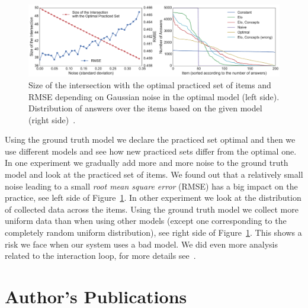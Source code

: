 \documentclass[table,color,cover,twoside,nolot,nolof]{fithesis3/fithesis3}
\begin{document}
\begin{figure}[h]
	\begin{center}
		\includegraphics[width=\textwidth]{figure/noise_vs_intersection_number_of_answers}
		\caption{Size of the intersection with the optimal practiced set of items and RMSE
			depending on Gaussian noise in the optimal model (left side). Distribution of answers over
			the items based on the given model (right side)~\cite{niznan2015exploring}.}
		\label{figure:feedback_by_success}
	\end{center}
\end{figure}

Using the ground truth model we declare the practiced set
optimal and then we use different models and see how new practiced sets
differ from the optimal one. In one experiment we gradually add more and more
noise to the ground truth model and look at the practiced set of items. We
found out that a relatively small noise leading to a small \emph{root mean
square error} (RMSE) has a big impact on the practice, see left side of
Figure~\ref{figure:feedback_by_success}. In other experiment we look at the
distribution of collected data across the items. Using the ground truth model
we collect more uniform data than when using other models (except one
corresponding to the completely random uniform distribution), see right side of
Figure~\ref{figure:feedback_by_success}. This shows a risk we face when our
system uses a bad model. We did even more analysis related to the interaction
loop, for more details see~\cite{niznan2015exploring}.

\chapter{Author's Publications}
\end{document}
